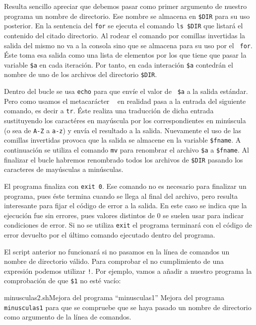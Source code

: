 Resulta sencillo apreciar  que debemos pasar como  primer argumento de
nuestro programa  un nombre de  directorio. Ese nombre se  almacena en
{\tt \$DIR}  para su uso posterior.  En la sentencia del  {\tt for} se
ejecuta el comando {\tt ls \$DIR}  que listará el contenido del citado
directorio. Al rodear el comando por comillas invertidas la salida del
mismo no va a la consola sino que  se almacena para su uso por el {\tt
for}. Éste  toma esa salida  como una lista  de elementos por  los que
tiene que pasar la variable {\tt \$a} en cada iteración. Por tanto, en
cada interación {\tt  \$a} contedrán el nombre de uno  de los archivos
del directorio {\tt \$DIR}.

Dentro del  bucle se usa  {\tt echo} para que  envíe el valor  de {\tt
\$a}  a la  salida estándar.  Pero  como usamos  el metacarácter  {\tt
\textbar}  en  realidad  pasa  a la  entrada  del  siguiente  comando,
es  decir  a  {\tt  tr}.  Éste  realiza  una  traducción  de
dicha  entrada  sustituyendo  los  caractéres  en  mayúscula  por  los
correspondientes en minúscula (o sea de {\tt A-Z} a {\tt a-z}) y envía
el resultado a la salida. Nuevamente el uso de las comillas invertidas
provoca que  la salida  se almacene  en la  variable {\tt  \$fname}. A
continuación se utiliza el comando  {\tt mv} para renombrar el archivo
{\tt \$a} a  {\tt \$fname}. Al finalizar el  bucle habremos renombrado
todos los archivos de {\tt \$DIR} pasando los caracteres de mayúsculas
a minúsculas.

El programa  finaliza con {\tt  exit 0}.  Ese comando no  es necesario
para finalizar un programa, pues éste termina cuando se llega al final
del archivo, pero resulta interesante para  fijar el código de error a
la salida.  En este caso se  indica que la ejecución  fue sin errores,
pues valores distintos de 0 se suelen usar para indicar condiciones de
error. Si no  se utiliza {\tt exit}  el programa terminará
con el código de error devuelto por el último comando ejecutado dentro
del programa.

El script anterior no funcionará si no pasamos en la línea de comandos
un nombre de  directorio válido. Para comprobar el  no cumplimiento de
una expresión podemos utilizar {\tt !}.  Por ejemplo, vamos a añadir a
nuestro programa la comprobación de que {\tt \$1} no esté vacío:

\begin{ejemplo}{minusculas2.sh}{Mejora del programa ``minusculas1''}
Mejora del programa {\tt minusculas1} para que se compruebe
que se haya pasado un nombre de directorio como argumento de la
línea de comandos.
\end{ejemplo}

